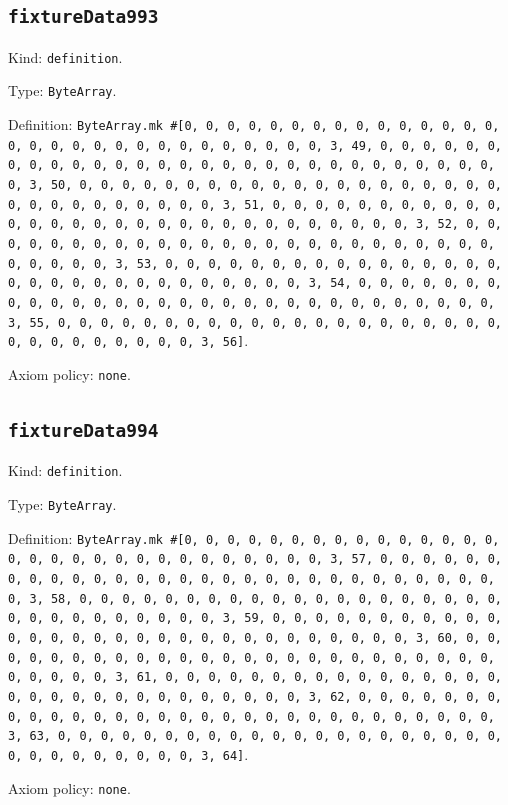 \documentclass[11pt]{article}
\begin{document}
\subsection*{\texttt{fixtureData993}}
\noindent Kind: \texttt{definition}.\par
\noindent Type: \texttt{ByteArray}.\par
\noindent Definition: \texttt{ByteArray.mk \#[0, 0, 0, 0, 0, 0, 0, 0, 0, 0, 0, 0, 0, 0, 0, 0, 0, 0, 0, 0, 0, 0, 0, 0, 0, 0, 0, 0, 0, 0, 3, 49, 0, 0, 0, 0, 0, 0, 0, 0, 0, 0, 0, 0, 0, 0, 0, 0, 0, 0, 0, 0, 0, 0, 0, 0, 0, 0, 0, 0, 0, 0, 3, 50, 0, 0, 0, 0, 0, 0, 0, 0, 0, 0, 0, 0, 0, 0, 0, 0, 0, 0, 0, 0, 0, 0, 0, 0, 0, 0, 0, 0, 0, 0, 3, 51, 0, 0, 0, 0, 0, 0, 0, 0, 0, 0, 0, 0, 0, 0, 0, 0, 0, 0, 0, 0, 0, 0, 0, 0, 0, 0, 0, 0, 0, 0, 3, 52, 0, 0, 0, 0, 0, 0, 0, 0, 0, 0, 0, 0, 0, 0, 0, 0, 0, 0, 0, 0, 0, 0, 0, 0, 0, 0, 0, 0, 0, 0, 3, 53, 0, 0, 0, 0, 0, 0, 0, 0, 0, 0, 0, 0, 0, 0, 0, 0, 0, 0, 0, 0, 0, 0, 0, 0, 0, 0, 0, 0, 0, 0, 3, 54, 0, 0, 0, 0, 0, 0, 0, 0, 0, 0, 0, 0, 0, 0, 0, 0, 0, 0, 0, 0, 0, 0, 0, 0, 0, 0, 0, 0, 0, 0, 3, 55, 0, 0, 0, 0, 0, 0, 0, 0, 0, 0, 0, 0, 0, 0, 0, 0, 0, 0, 0, 0, 0, 0, 0, 0, 0, 0, 0, 0, 0, 0, 3, 56]}.\par
\noindent Axiom policy: \texttt{none}.\par
\subsection*{\texttt{fixtureData994}}
\noindent Kind: \texttt{definition}.\par
\noindent Type: \texttt{ByteArray}.\par
\noindent Definition: \texttt{ByteArray.mk \#[0, 0, 0, 0, 0, 0, 0, 0, 0, 0, 0, 0, 0, 0, 0, 0, 0, 0, 0, 0, 0, 0, 0, 0, 0, 0, 0, 0, 0, 0, 3, 57, 0, 0, 0, 0, 0, 0, 0, 0, 0, 0, 0, 0, 0, 0, 0, 0, 0, 0, 0, 0, 0, 0, 0, 0, 0, 0, 0, 0, 0, 0, 3, 58, 0, 0, 0, 0, 0, 0, 0, 0, 0, 0, 0, 0, 0, 0, 0, 0, 0, 0, 0, 0, 0, 0, 0, 0, 0, 0, 0, 0, 0, 0, 3, 59, 0, 0, 0, 0, 0, 0, 0, 0, 0, 0, 0, 0, 0, 0, 0, 0, 0, 0, 0, 0, 0, 0, 0, 0, 0, 0, 0, 0, 0, 0, 3, 60, 0, 0, 0, 0, 0, 0, 0, 0, 0, 0, 0, 0, 0, 0, 0, 0, 0, 0, 0, 0, 0, 0, 0, 0, 0, 0, 0, 0, 0, 0, 3, 61, 0, 0, 0, 0, 0, 0, 0, 0, 0, 0, 0, 0, 0, 0, 0, 0, 0, 0, 0, 0, 0, 0, 0, 0, 0, 0, 0, 0, 0, 0, 3, 62, 0, 0, 0, 0, 0, 0, 0, 0, 0, 0, 0, 0, 0, 0, 0, 0, 0, 0, 0, 0, 0, 0, 0, 0, 0, 0, 0, 0, 0, 0, 3, 63, 0, 0, 0, 0, 0, 0, 0, 0, 0, 0, 0, 0, 0, 0, 0, 0, 0, 0, 0, 0, 0, 0, 0, 0, 0, 0, 0, 0, 0, 0, 3, 64]}.\par
\noindent Axiom policy: \texttt{none}.\par
\end{document}
